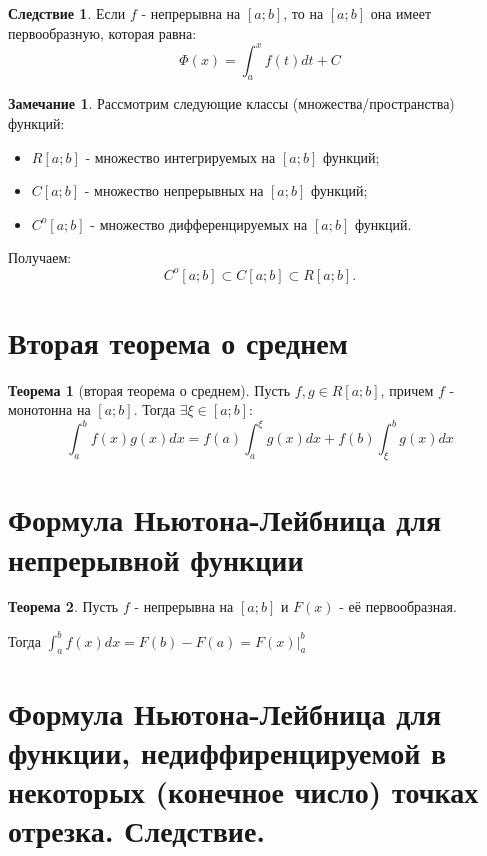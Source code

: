 \documentclass{report}
\theoremstyle{definition}
\newtheorem*{effect}{Следствие}
\newtheorem*{remark}{Замечание}
\newtheorem*{theorem}{Теорема}
\begin{document}
\begin{effect}
    Если $f$ - непрерывна на $[a;b]$, то на $[a;b]$ она имеет первообразную, которая равна:
    \begin{equation*}
        \Phi (x) = \int_{a}^{x}f(t)dt + C
    \end{equation*}
\end{effect}

\begin{remark}
    Рассмотрим следующие классы (множества/пространства) функций:
    \begin{itemize}
        \item $R[a;b]$ - множество интегрируемых на $[a;b]$ функций;
        \item $C[a;b]$ - множество непрерывных на $[a;b]$ функций;
        \item $C^{o}[a;b]$ - множество дифференцируемых на $[a;b]$ функций.
    \end{itemize}
    Получаем:
    \begin{equation*}
        C^{o}[a;b]\subset C[a;b] \subset R[a;b].
    \end{equation*}
\end{remark}

\section{Вторая теорема о среднем}

\begin{theorem}[вторая теорема о среднем]
    Пусть $f,g\in R[a;b]$, причем $f$ - монотонна на $[a;b]$. Тогда $\exists \xi \in [a;b]:$
    \begin{equation*}
        \int_{a}^{b}f(x)g(x)dx = f(a)\int_{a}^{\xi}g(x)dx + f(b)\int_{\xi}^{b}g(x)dx
    \end{equation*}
\end{theorem}

\section{Формула Ньютона-Лейбница для непрерывной функции}

\begin{theorem}
    Пусть $f$ - непрерывна на $[a;b]$ и $F(x)$ - её первообразная.

    Тогда $\int_{a}^{b}f(x)dx = F(b) - F(a) = F(x)|_{a}^{b}$
\end{theorem}

\section{Формула Ньютона-Лейбница для функции, недиффиренцируемой в
  некоторых (конечное число) точках отрезка. Следствие.}
\end{document}
